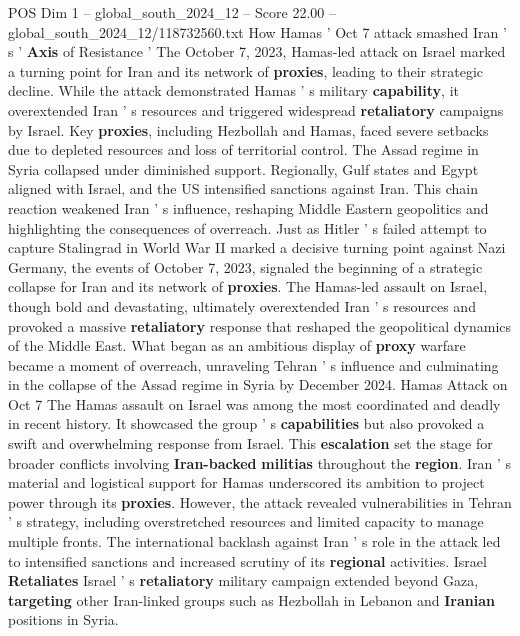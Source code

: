 \begin{textsample}{POS Dim 1 – global\_south\_2024\_12 – Score 22.00 – global\_south\_2024\_12/118732560.txt}  \label{ex:f1_pos_192}
How Hamas ' Oct 7 attack smashed Iran ' s ' \textbf{Axis} of Resistance ' The October 7, 2023, Hamas-led attack on Israel marked a turning point for Iran and its network of \textbf{proxies}, leading to their strategic decline.
While the attack demonstrated Hamas ' s military \textbf{capability}, it overextended Iran ' s resources and triggered widespread \textbf{retaliatory} campaigns by Israel.
Key \textbf{proxies}, including Hezbollah and Hamas, faced severe setbacks due to depleted resources and loss of territorial control.
The Assad regime in Syria collapsed under diminished support.
Regionally, Gulf states and Egypt aligned with Israel, and the US intensified sanctions against Iran.
This chain reaction weakened Iran ' s influence, reshaping Middle Eastern geopolitics and highlighting the consequences of overreach.
Just as Hitler ' s failed attempt to capture Stalingrad in World War II marked a decisive turning point against Nazi Germany, the events of October 7, 2023, signaled the beginning of a strategic collapse for Iran and its network of \textbf{proxies}.
The Hamas-led assault on Israel, though bold and devastating, ultimately overextended Iran ' s resources and provoked a massive \textbf{retaliatory} response that reshaped the geopolitical dynamics of the Middle East.
What began as an ambitious display of \textbf{proxy} warfare became a moment of overreach, unraveling Tehran ' s influence and culminating in the collapse of the Assad regime in Syria by December 2024.
Hamas Attack on Oct 7 The Hamas assault on Israel was among the most coordinated and deadly in recent history.
It showcased the group ' s \textbf{capabilities} but also provoked a swift and overwhelming response from Israel.
This \textbf{escalation} set the stage for broader conflicts involving \textbf{Iran-backed} \textbf{militias} throughout the \textbf{region}.
Iran ' s material and logistical support for Hamas underscored its ambition to project power through its \textbf{proxies}.
However, the attack revealed vulnerabilities in Tehran ' s strategy, including overstretched resources and limited capacity to manage multiple fronts.
The international backlash against Iran ' s role in the attack led to intensified sanctions and increased scrutiny of its \textbf{regional} activities.
Israel \textbf{Retaliates} Israel ' s \textbf{retaliatory} military campaign extended beyond Gaza, \textbf{targeting} other Iran-linked groups such as Hezbollah in Lebanon and \textbf{Iranian} positions in Syria.

\end{textsample}
